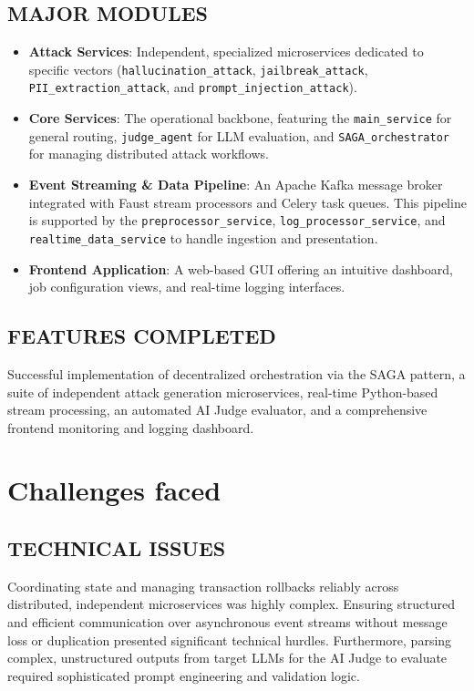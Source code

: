 \documentclass[12pt,a4paper]{article}
\begin{document}
\subsection*{MAJOR MODULES}
\begin{itemize}
    \item \textbf{Attack Services}: Independent, specialized microservices dedicated to specific vectors (\texttt{hallucination\_attack}, \texttt{jailbreak\_attack}, \texttt{PII\_extraction\_attack}, and \texttt{prompt\_injection\_attack}).
    \item \textbf{Core Services}: The operational backbone, featuring the \texttt{main\_service} for general routing, \texttt{judge\_agent} for LLM evaluation, and \texttt{SAGA\_orchestrator} for managing distributed attack workflows.
    \item \textbf{Event Streaming \& Data Pipeline}: An Apache Kafka message broker integrated with Faust stream processors and Celery task queues. This pipeline is supported by the \texttt{preprocessor\_service}, \texttt{log\_processor\_service}, and \texttt{realtime\_data\_service} to handle ingestion and presentation.
    \item \textbf{Frontend Application}: A web-based GUI offering an intuitive dashboard, job configuration views, and real-time logging interfaces.
\end{itemize}

\subsection*{FEATURES COMPLETED}
Successful implementation of decentralized orchestration via the SAGA pattern, a suite of independent attack generation microservices, real-time Python-based stream processing, an automated AI Judge evaluator, and a comprehensive frontend monitoring and logging dashboard.

\section*{Challenges faced}

\subsection*{TECHNICAL ISSUES}
Coordinating state and managing transaction rollbacks reliably across distributed, independent microservices was highly complex. Ensuring structured and efficient communication over asynchronous event streams without message loss or duplication presented significant technical hurdles. Furthermore, parsing complex, unstructured outputs from target LLMs for the AI Judge to evaluate required sophisticated prompt engineering and validation logic.
\end{document}

